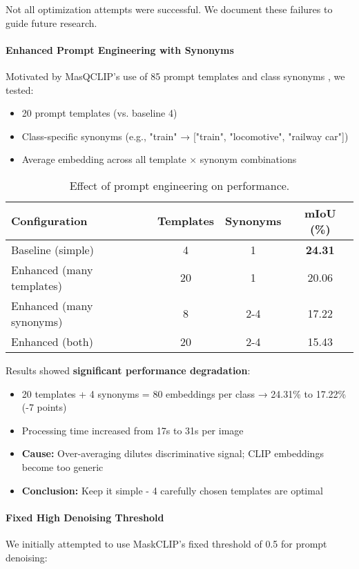 Not all optimization attempts were successful. We document these failures to guide future research.

\paragraph{Enhanced Prompt Engineering with Synonyms}
Motivated by MasQCLIP's use of 85 prompt templates and class synonyms \cite{zhou2022extract}, we tested:

\begin{itemize}
    \item 20 prompt templates (vs. baseline 4)
    \item Class-specific synonyms (e.g., "train" → ["train", "locomotive", "railway car"])
    \item Average embedding across all template $\times$ synonym combinations
\end{itemize}

\begin{table}[h]
\centering
\caption{Effect of prompt engineering on performance.}
\label{tab:prompt_engineering_failure}
\begin{tabular}{lccc}
\hline
\textbf{Configuration} & \textbf{Templates} & \textbf{Synonyms} & \textbf{mIoU (\%)} \\
\hline
Baseline (simple) & 4 & 1 & \textbf{24.31} \\
Enhanced (many templates) & 20 & 1 & 20.06 \\
Enhanced (many synonyms) & 8 & 2-4 & 17.22 \\
Enhanced (both) & 20 & 2-4 & 15.43 \\
\hline
\end{tabular}
\end{table}

Results showed \textbf{significant performance degradation}:
\begin{itemize}
    \item 20 templates + 4 synonyms = 80 embeddings per class → 24.31\% to 17.22\% (-7 points)
    \item Processing time increased from 17s to 31s per image
    \item \textbf{Cause:} Over-averaging dilutes discriminative signal; CLIP embeddings become too generic
    \item \textbf{Conclusion:} Keep it simple - 4 carefully chosen templates are optimal
\end{itemize}

\paragraph{Fixed High Denoising Threshold}
We initially attempted to use MaskCLIP's fixed threshold of 0.5 for prompt denoising:


